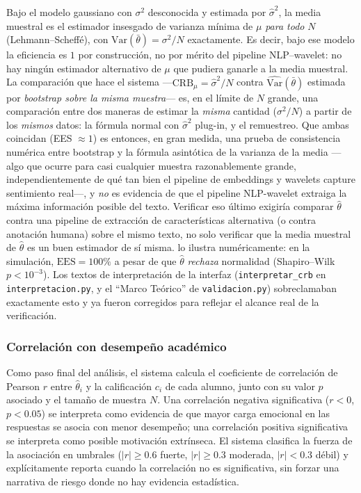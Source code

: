 \documentclass[11pt,a4paper,oneside]{article}
\theoremstyle{definition}
\begin{document}
\begin{warningBox}[title=Hueco: qué NO certifica esta verificación]
Bajo el modelo gaussiano con $\sigma^2$ desconocida y estimada por $\hat\sigma^2$, la media
muestral es el estimador insesgado de varianza mínima de $\mu$ \emph{para todo} $N$
(Lehmann--Scheffé), con $\mathrm{Var}(\bar\theta)=\sigma^2/N$ exactamente. Es decir, bajo ese
modelo la eficiencia es $1$ por construcción, no por mérito del pipeline NLP--wavelet: no hay
ningún estimador alternativo de $\mu$ que pudiera ganarle a la media muestral. La comparación que
hace el sistema —$\mathrm{CRB}_\mu=\hat\sigma^2/N$ contra $\widehat{\mathrm{Var}}(\bar\theta)$
estimada por \emph{bootstrap sobre la misma muestra}— es, en el límite de $N$ grande, una
comparación entre dos maneras de estimar la \emph{misma} cantidad ($\sigma^2/N$) a partir de los
\emph{mismos} datos: la fórmula normal con $\hat\sigma^2$ plug-in, y el remuestreo. Que ambas
coincidan (EES $\approx 1$) es entonces, en gran medida, una prueba de consistencia numérica
entre bootstrap y la fórmula asintótica de la varianza de la media —algo que ocurre para casi
cualquier muestra razonablemente grande, independientemente de qué tan bien el pipeline de
embeddings y wavelets capture sentimiento real—, y \emph{no} es evidencia de que el pipeline
NLP-wavelet extraiga la máxima información posible del texto. Verificar eso último exigiría
comparar $\hat\theta$ contra una pipeline de extracción de características alternativa (o contra
anotación humana) sobre el mismo texto, no solo verificar que la media muestral de $\hat\theta$
es un buen estimador de sí misma.  lo ilustra numéricamente: en la
simulación, $\mathrm{EES}=100\%$ a pesar de que $\hat\theta$ \emph{rechaza} normalidad
(Shapiro--Wilk $p<10^{-3}$). Los textos de interpretación de la interfaz
(\texttt{interpretar\_crb} en \texttt{interpretacion.py}, y el ``Marco Teórico'' de
\texttt{validacion.py}) sobreclamaban exactamente esto y ya fueron corregidos para reflejar el
alcance real de la verificación.
\end{warningBox}

\subsubsection{Correlación con desempeño académico}

Como paso final del análisis, el sistema calcula el coeficiente de correlación de Pearson $r$
\cite{Pearson1896} entre $\hat\theta_i$ y la calificación $c_i$ de cada alumno, junto con su
valor $p$ asociado y el tamaño de muestra $N$. Una correlación negativa significativa ($r<0$,
$p<0.05$) se interpreta como evidencia de que mayor carga emocional en las respuestas se asocia
con menor desempeño; una correlación positiva significativa se interpreta como posible
motivación extrínseca. El sistema clasifica la fuerza de la asociación en umbrales ($|r|\ge 0.6$
fuerte, $|r|\ge 0.3$ moderada, $|r|<0.3$ débil) y explícitamente reporta cuando la correlación no
es significativa, sin forzar una narrativa de riesgo donde no hay evidencia estadística.
\end{document}
